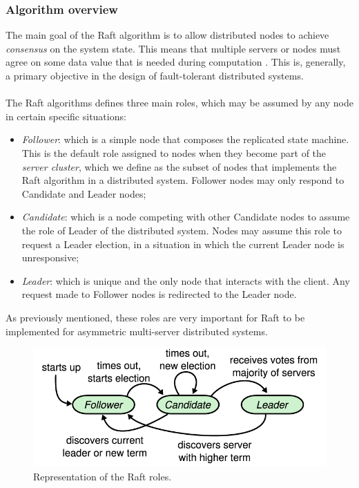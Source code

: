 \subsubsection{Algorithm overview}
The main goal of the Raft algorithm is to allow distributed nodes to achieve \textit{consensus} on the system state. This means that multiple servers or nodes must agree on some data value that is needed during computation \cite{site:consensus-wiki, site:raft-consensus-algorithm}. This is, generally, a primary objective in the design of fault-tolerant distributed systems. \\ \\
The Raft algorithms defines three main roles, which may be assumed by any node in certain specific situations:
\begin{itemize}
	\item \textit{Follower}: which is a simple node that composes the replicated state machine. This is the default role assigned to nodes when they become part of the \textit{server cluster}, which we define as the subset of nodes that implements the Raft algorithm in a distributed system. Follower nodes may only respond to Candidate and Leader nodes;
	\item \textit{Candidate}: which is a node competing with other Candidate nodes to assume the role of Leader of the distributed system. Nodes may assume this role to request a Leader election, in a situation in which the current Leader node is unresponsive;
	\item \textit{Leader}: which is unique and the only node that interacts with the client. Any request made to Follower nodes is redirected to the Leader node.
\end{itemize}
As previously mentioned, these roles are very important for Raft to be implemented for asymmetric multi-server distributed systems.
\begin{figure}[h]
	\centering
	\includegraphics[width=0.7\linewidth]{"immagini/Technologies/image3.png"}
	\caption{Representation of the Raft roles.}
	\label{fig:roles}
\end{figure}
